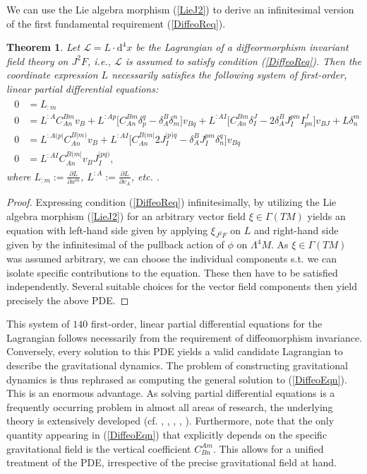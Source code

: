 \documentclass[%
preprint,
titlepage,
nofootinbib,
amsmath,amssymb,
showkeys,
aps,
prd,
floatfix,
]{revtex4-2}
\newtheorem{theorem}{Theorem}
\begin{document}
We can use the Lie algebra morphism (\ref{LieJ2}) to derive an infinitesimal version of the first fundamental requirement (\ref{DiffeoReq}).
\begin{theorem}
Let $\mathcal{L} = L \cdot \mathrm{d}^4x$ be the Lagrangian of a diffeormorphism invariant field theory on $J^2F$, i.e., $\mathcal{L}$ is assumed to satisfy condition (\ref{DiffeoReq}). Then the coordinate expression $L$ necessarily satisfies the following system of first-order, linear partial differential equations:  
\begin{align}\label{DiffeoEqn}
\begin{aligned}
    0 &= L_{:m} \\
    0 &= L^{:A} C_{An}^{Bm} v_B + L^{:Ap} \bigl[ C_{An}^{Bm} \delta_p^q - \delta_A^B \delta_m^n \bigr] v_{Bq}+ L^{:AI} \bigl[ C_{An}^{Bm} \delta_I^J - 2 \delta_A^B J_I^{pm} I^J_{pn}  \bigr] v_{BJ} + L \delta^m_n \\
    0 &= L^{:A(p\vert}C_{An}^{B \vert m)} v_B + L^{: AI} \bigl[ C_{An}^{B(m\vert} 2 J_I^{\vert p) q} - \delta^B_A J_I ^{pm} \delta_n^q \bigr] v_{Bq} \\
    0 &= L^{:AI} C_{An}^{B(m\vert} v_B J_I^{\vert p q )},
\end{aligned}
\end{align}
where $L_{:m} := \frac{\partial L}{\partial x^m}$, $L^{:A} := \frac{\partial L}{ \partial v_A}$, etc. .
\end{theorem}
\begin{proof}
Expressing condition (\ref{DiffeoReq}) infinitesimally, by utilizing the Lie algebra morphism (\ref{LieJ2}) for an arbitrary vector field $\xi \in \Gamma(TM)$ yields an equation with left-hand side given by applying $\xi_{J^2F}$ on $L$ and right-hand side given by the infinitesimal of the pullback action of $\phi$ on $\Lambda^4M$.
As $\xi \in \Gamma(TM)$ was assumed arbitrary, we can choose the individual components s.t. we can isolate specific contributions to the equation. These then have to be satisfied independently. Several suitable choices for the vector field components then yield precisely the above PDE. 
\end{proof}

This system of $140$ first-order, linear partial differential equations for the Lagrangian follows necessarily from the requirement of diffeomorphism invariance. 
Conversely, every solution to this PDE yields a valid candidate Lagrangian to describe the gravitational dynamics. 
The problem of constructing gravitational dynamics is thus rephrased as computing the general solution to (\ref{DiffeoEqn}). 
This is an enormous advantage. As solving partial differential equations is a frequently occurring problem in almost all areas of research, the underlying theory is extensively developed (cf. \cite{seiler2009involution}, \cite{hormander1994analysis}, \cite{hormander2009analysis}, \cite{hormander2015analysis}, \cite{Hilbert}).
Furthermore, note that the only quantity appearing in (\ref{DiffeoEqn}) that explicitly depends on the specific gravitational field is the vertical coefficient $C^{Am}_{Bn}$. This allows for a unified treatment of the PDE, irrespective of the precise gravitational field at hand. 
\end{document}
